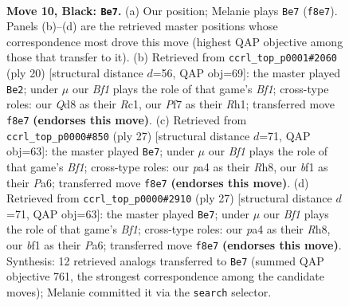 \documentclass[11pt]{article}
\begin{document}
\begin{figure}[p]
\label{fig:thought-m17}
\end{figure}

\clearpage

\begin{figure}[p]\centering
\begin{subfigure}{0.46\textwidth}\centering
\resizebox{\linewidth}{!}{%
\newchessgame
\chessboard[
  setfen={r2qkb1r/pp3p1p/n3pnp1/3p2B1/P2P2P1/2N2Q1P/1PP2P2/R3KB1R b KQkq - 2 10},
  showmover=false,
  pgfstyle=straightmove, color=movearrow, markmove={f8-e7}
]}
\caption{}
\end{subfigure}\hfill
\begin{subfigure}{0.46\textwidth}\centering
\resizebox{\linewidth}{!}{%
\newchessgame
\chessboard[
  setfen={r1br2k1/ppp2pp1/2n2q1p/3p4/1b1P4/1QN1PN2/PP3PPP/2R1KB1R w K - 2 11},
  showmover=false,
  pgfstyle=straightmove, color=movearrow, markmove={f1-e2}
]}
\caption{}
\end{subfigure}
\\[4pt]
\begin{subfigure}{0.46\textwidth}\centering
\resizebox{\linewidth}{!}{%
\newchessgame
\chessboard[
  setfen={r2qkb1r/1p3p2/p2p1np1/3np1Bp/8/1N3P2/PPPQ2PP/1K1R1B1R b kq - 1 14},
  showmover=false,
  pgfstyle=straightmove, color=movearrow, markmove={f8-e7}
]}
\caption{}
\end{subfigure}\hfill
\begin{subfigure}{0.46\textwidth}\centering
\resizebox{\linewidth}{!}{%
\newchessgame
\chessboard[
  setfen={r2qkb1r/1p3p2/p2p1np1/3np1Bp/8/1N3P2/PPPQ2PP/1K1R1B1R b kq - 1 14},
  showmover=false,
  pgfstyle=straightmove, color=movearrow, markmove={f8-e7}
]}
\caption{}
\end{subfigure}
\caption{\textbf{Move 10, Black: \texttt{Be7}.} (a) Our position; Melanie plays \texttt{Be7} (\texttt{f8e7}). Panels (b)--(d) are the retrieved master positions whose correspondence most drove this move (highest QAP objective among those that transfer to it). (b) Retrieved from \texttt{ccrl\_top\_p0001\#2060} (ply 20) [structural distance $d$=56, QAP obj=69]: the master played \texttt{Be2}; under $\mu$ our \emph{Bf1} plays the role of that game's \emph{Bf1}; cross-type roles: our \emph{Q}d8 as their \emph{R}c1, our \emph{P}f7 as their \emph{R}h1; transferred move \texttt{f8e7} \textbf{(endorses this move)}. (c) Retrieved from \texttt{ccrl\_top\_p0000\#850} (ply 27) [structural distance $d$=71, QAP obj=63]: the master played \texttt{Be7}; under $\mu$ our \emph{Bf1} plays the role of that game's \emph{Bf1}; cross-type roles: our \emph{p}a4 as their \emph{R}h8, our \emph{b}f1 as their \emph{P}a6; transferred move \texttt{f8e7} \textbf{(endorses this move)}. (d) Retrieved from \texttt{ccrl\_top\_p0000\#2910} (ply 27) [structural distance $d$=71, QAP obj=63]: the master played \texttt{Be7}; under $\mu$ our \emph{Bf1} plays the role of that game's \emph{Bf1}; cross-type roles: our \emph{p}a4 as their \emph{R}h8, our \emph{b}f1 as their \emph{P}a6; transferred move \texttt{f8e7} \textbf{(endorses this move)}. Synthesis: 12 retrieved analogs transferred to \texttt{Be7} (summed QAP objective 761, the strongest correspondence among the candidate moves); Melanie committed it via the \texttt{search} selector.}

\end{figure}
\end{document}
